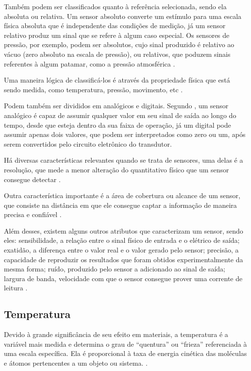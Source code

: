 Também podem ser classificados quanto à referência selecionada, sendo ela absoluta ou relativa. Um sensor
absoluto converte um estímulo para uma escala física absoluta que é independente das condições de medição, já
um sensor relativo produz um sinal que se refere à algum caso especial. Os sensores de pressão, por exemplo,
podem ser absolutos, cujo sinal produzido é relativo ao vácuo (zero absoluto na escala de pressão), ou
relativos, que poduzem sinais referentes à algum patamar, como a pressão atmosférica \cite{fraden2010}.

Uma maneira lógica de classificá-los é através da propriedade física que está sendo medida, como
temperatura, pressão, movimento, etc \cite{kenny_walt2005}.

Podem também ser divididos em analógicos e digitais. Segundo , um sensor
analógico é capaz de assumir qualquer valor em seu sinal de saída ao longo do tempo, desde que esteja dentro
da sua faixa de operação, já um digital pode assumir apenas dois valores, que podem ser interpretados como
zero ou um, após serem convertidos pelo circuito eletrônico do transdutor.

Há diversas características relevantes quando se trata de sensores, uma delas é a resolução, que mede a
menor alteração do quantitativo físico que um sensor consegue detectar \cite{sinclair2001}.

Outra característica importante é a área de cobertura ou alcance de um sensor, que consiste na distância em
que ele consegue captar a informação de maneira precisa e confiável \cite{karl_willig2005}.

Além desses, existem alguns outros atributos que caracterizam um sensor, sendo eles: sensibilidade, a relação
entre o sinal físico de entrada e o elétrico de saída; exatidão, a diferença entre o valor real e o valor
gerado pelo sensor; precisão, a capacidade de reproduzir os resultados que foram obtidos experimentalmente da
mesma forma; ruído, produzido pelo sensor a adicionado ao sinal de saída; largura de banda, velocidade com que
o sensor consegue prover uma corrente de leitura \cite{kenny_walt2005,kondrasovas2013}.

\subsection{Temperatura}
Devido à grande significância de seu efeito em materiais, a temperatura é a variável mais medida e determina o
grau de ``quentura'' ou ``frieza'' referenciada à uma escala específica. Ela é proporcional à taxa de energia
cinética das moléculas e átomos pertencentes a um objeto ou sistema.
\cite{fontes2005,peeters_peetermans_indesteege2007}.

